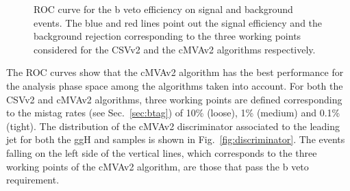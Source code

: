 \begin{figure}[htb]
\centering
{}
\caption{ROC curve for the b veto efficiency on signal and background events. The blue and red lines point out the signal efficiency and the background rejection corresponding to the three working points considered for the CSVv2 and the cMVAv2 algorithms
respectively.}\label{fig:btag}
\end{figure}

The ROC curves show that the cMVAv2 algorithm has the best performance for the analysis phase space among the algorithms taken into account. For both the CSVv2 and cMVAv2 algorithms, three working points are defined corresponding to the mistag rates (see Sec.~\ref{sec:btag}) of 10\% (loose), 1\% (medium) and 0.1\% (tight). The distribution of the cMVAv2 discriminator associated to the leading jet for both the ggH and \ttbar samples is shown in Fig.~\ref{fig:discriminator}. The events falling on the left side of the vertical lines, which corresponds to the three working points of the cMVAv2 algorithm, are those that pass the b veto requirement.

